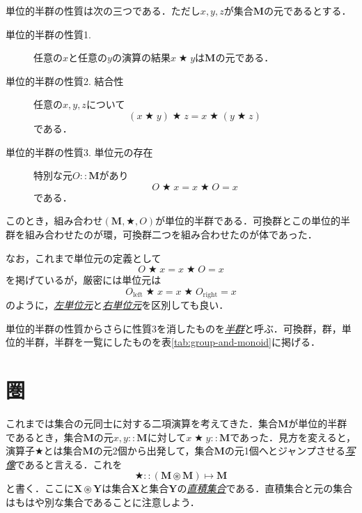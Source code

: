 \documentclass[a4paper]{jsbook}
\newcommand{\keyword}[1]{{\underline{\emph{#1}}}}
\newcommand{\mathSub}[1]{\textrm{#1}}
\newcommand{\mathSet}[1]{\mathbf{#1}} %
\newcommand{\mathLeft}{\mathSub{left}}
\newcommand{\mathRight}{\mathSub{right}}
\newcommand{\mathAnyBinaryOperator}{\mathbin{\bigstar}}
\newcommand{\mathIn}{\mathrel{::}}
\newcommand{\mathSetTimes}{\mathbin{\circledast}}
\newcommand{\mathMapsTo}{\mapsto}
\newcommand{\mathMorph}[2]{#1\mathMapsTo#2}
\newcommand{\mathMonoid}[3]{(#1,#2,#3)}
\begin{document}
単位的半群の性質は次の三つである．ただし$x,y,z$が集合$\mathSet{M}$の元であるとする．
\begin{description}
\item[単位的半群の性質1.] 任意の$x$と任意の$y$の演算の結果$x\mathAnyBinaryOperator y$は$\mathSet{M}$の元である．
\item[単位的半群の性質2. 結合性] 任意の$x,y,z$について
\begin{equation}
(x\mathAnyBinaryOperator y)\mathAnyBinaryOperator z=x\mathAnyBinaryOperator(y\mathAnyBinaryOperator z)
\end{equation}
である．
\item[単位的半群の性質3. 単位元の存在] 特別な元$O\mathIn\mathSet{M}$があり
\begin{equation}
O\mathAnyBinaryOperator x=x\mathAnyBinaryOperator O=x
\end{equation}
である．
\end{description}
このとき，組み合わせ$\mathMonoid{\mathSet{M}}{\mathAnyBinaryOperator}{O}$が単位的半群である．可換群とこの単位的半群を組み合わせたのが環，可換群二つを組み合わせたのが体であった．

なお，これまで単位元の定義として
\begin{equation}
O\mathAnyBinaryOperator x=x\mathAnyBinaryOperator O=x
\end{equation}
を掲げているが，厳密には単位元は
\begin{equation}
O_\mathLeft\mathAnyBinaryOperator x=x\mathAnyBinaryOperator O_\mathRight=x
\end{equation}
のように，\keyword{左単位元}と\keyword{右単位元}を区別しても良い．

単位的半群の性質からさらに性質3を消したものを\keyword{半群}と呼ぶ．可換群，群，単位的半群，半群を一覧にしたものを表\ref{tab:group-and-monoid}に掲げる．

\section{圏}

これまでは集合の元同士に対する二項演算を考えてきた．集合$\mathSet{M}$が単位的半群であるとき，集合$\mathSet{M}$の元$x,y\mathIn\mathSet{M}$に対して$x\mathAnyBinaryOperator y\mathIn\mathSet{M}$であった．見方を変えると，演算子$\mathAnyBinaryOperator$とは集合$\mathSet{M}$の元2個から出発して，集合$\mathSet{M}$の元1個へとジャンプさせる\keyword{写像}であると言える．これを
\begin{equation}
\mathAnyBinaryOperator\mathIn{}\mathMorph{(\mathSet{M}\mathSetTimes\mathSet{M})}{\mathSet{M}}
\end{equation}
と書く．ここに$\mathSet{X}\mathSetTimes\mathSet{Y}$は集合$\mathSet{X}$と集合$\mathSet{Y}$の\keyword{直積集合}である．直積集合と元の集合はもはや別な集合であることに注意しよう．
\end{document}
